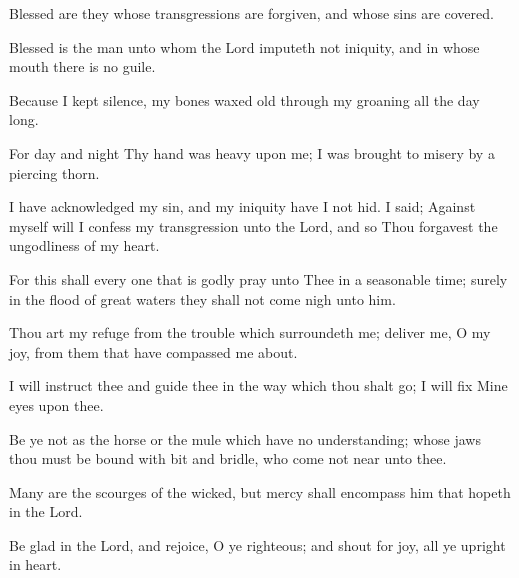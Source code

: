 Blessed are they whose transgressions are forgiven, and whose sins are covered.

Blessed is the man unto whom the Lord imputeth not iniquity, and in whose mouth there is no guile.

Because I kept silence, my bones waxed old through my groaning all the day long.

For day and night Thy hand was heavy upon me; I was brought to misery by a piercing thorn.

I have acknowledged my sin, and my iniquity have I not hid. I said; Against myself will I confess my transgression unto the Lord, and so Thou forgavest the ungodliness of my heart.

For this shall every one that is godly pray unto Thee in a seasonable time; surely in the flood of great waters they shall not come nigh unto him.

Thou art my refuge from the trouble which surroundeth me; deliver me, O my joy, from them that have compassed me about.

I will instruct thee and guide thee in the way which thou shalt go; I will fix Mine eyes upon thee.

Be ye not as the horse or the mule which have no understanding; whose jaws thou must be bound with bit and bridle, who come not near unto thee.

Many are the scourges of the wicked, but mercy shall encompass him that hopeth in the Lord.

Be glad in the Lord, and rejoice, O ye righteous; and shout for joy, all ye upright in heart.

